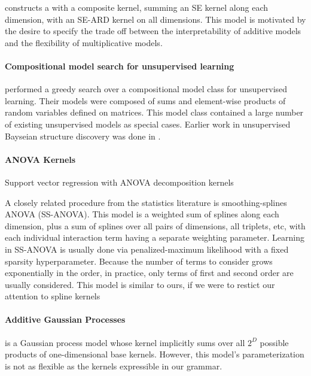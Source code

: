 \documentclass[twoside]{article}
\begin{document}
\cite{plate1999accuracy} constructs a \gp{} with a composite kernel, summing an SE kernel along each dimension, with an SE-ARD kernel on all dimensions.  This model is motivated by the desire to specify the trade off between the interpretability of additive models and the flexibility of multiplicative models.

\paragraph{Compositional model search for unsupervised learning} \cite{grosse2012exploiting} performed a greedy search over a compositional model class for unsupervised learning.  Their models were composed of sums and element-wise products of random variables defined on matrices.  This model class contained a large number of existing unsupervised models as special cases.  Earlier work in unsupervised Bayseian structure discovery was done in \cite{kemp2008discovery}.

\paragraph{ANOVA Kernels}

Support vector regression with ANOVA decomposition kernels \cite{stitson1999support}

A closely related procedure from the statistics literature is smoothing-splines ANOVA (SS-ANOVA)\cite{wahba1990spline, gu2002smoothing}.
This model is a weighted sum of splines along each dimension, plus a sum of splines over all pairs of dimensions, all triplets, etc, with each individual interaction term having a separate weighting parameter.
Learning in SS-ANOVA is usually done via penalized-maximum likelihood with a fixed sparsity hyperparameter.
Because the number of terms to consider grows exponentially in the order, in practice, only terms of first and second order are usually considered.  This model is similar to ours, if we were to restict our attention to spline kernels

\paragraph{Additive Gaussian Processes} \cite{duvenaud2011additive11} is a Gaussian process model whose kernel implicitly sums over all $2^D$ possible products of one-dimensional base kernels.  
However, this model's parameterization is not as flexible as the kernels expressible in our grammar.
\end{document}
